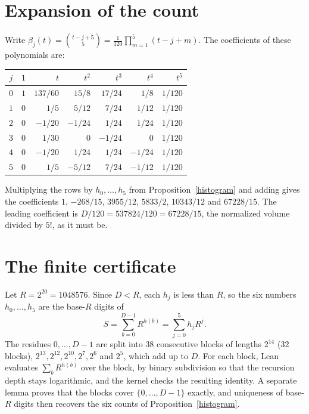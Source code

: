 \documentclass[11pt]{article}
\theoremstyle{remark}
\begin{document}
\begin{appendices}
\section{Expansion of the count}\label{app:expansion}
Write $\beta_j(t)=\binom{t-j+5}{5}=\frac1{120}\prod_{m=1}^5(t-j+m)$. The coefficients of these polynomials are:
\begin{center}
\begin{tabular}{@{}crrrrrr@{}}
\toprule
$j$ & $1$ & $t$ & $t^2$ & $t^3$ & $t^4$ & $t^5$\\
\midrule
$0$ & $1$ & $137/60$ & $15/8$ & $17/24$ & $1/8$ & $1/120$\\
$1$ & $0$ & $1/5$ & $5/12$ & $7/24$ & $1/12$ & $1/120$\\
$2$ & $0$ & $-1/20$ & $-1/24$ & $1/24$ & $1/24$ & $1/120$\\
$3$ & $0$ & $1/30$ & $0$ & $-1/24$ & $0$ & $1/120$\\
$4$ & $0$ & $-1/20$ & $1/24$ & $1/24$ & $-1/24$ & $1/120$\\
$5$ & $0$ & $1/5$ & $-5/12$ & $7/24$ & $-1/12$ & $1/120$\\
\bottomrule
\end{tabular}
\end{center}
Multiplying the rows by $h_0,\dots,h_5$ from Proposition~\ref{histogram} and adding gives the coefficients $1$, $-268/15$, $3955/12$, $5833/2$, $10343/12$ and $67228/15$. The leading coefficient is $D/120=537824/120=67228/15$, the normalized volume divided by $5!$, as it must be.

\section{The finite certificate}\label{app:certificate}
Let $R=2^{20}=1048576$. Since $D<R$, each $h_j$ is less than $R$, so the six numbers $h_0,\dots,h_5$ are the base-$R$ digits of
\[
S=\sum_{b=0}^{D-1}R^{h(b)}=\sum_{j=0}^5h_jR^j .
\]
The residues $0,\dots,D-1$ are split into $38$ consecutive blocks of lengths $2^{14}$ ($32$ blocks), $2^{13},2^{12},2^{10},2^7,2^6$ and $2^5$, which add up to $D$. For each block, Lean evaluates $\sum_bR^{h(b)}$ over the block, by binary subdivision so that the recursion depth stays logarithmic, and the kernel checks the resulting identity. A separate lemma proves that the blocks cover $\{0,\dots,D-1\}$ exactly, and uniqueness of base-$R$ digits then recovers the six counts of Proposition~\ref{histogram}.
\end{appendices}
\end{document}
